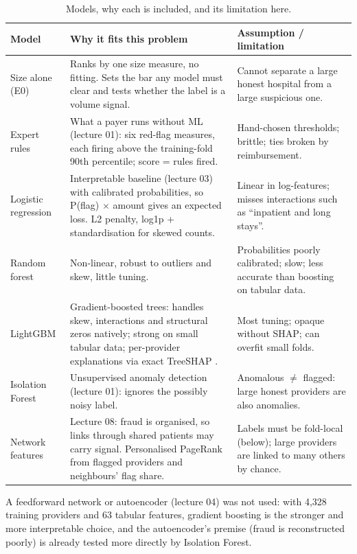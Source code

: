\documentclass[11pt,a4paper]{article}
\begin{document}
\begin{table}[H]\centering\small
\caption{Models, why each is included, and its limitation here.}\label{tab:models}
\begin{tabularx}{\linewidth}{p{2.5cm}XX}
\toprule
Model & Why it fits this problem & Assumption / limitation \\
\midrule
Size alone (E0) & Ranks by one size measure, no fitting. Sets the bar any model must clear and tests whether the label is a volume signal. & Cannot separate a large honest hospital from a large suspicious one. \\
Expert rules & What a payer runs without ML (lecture 01): six red-flag measures, each firing above the training-fold 90th percentile; score = rules fired. & Hand-chosen thresholds; brittle; ties broken by reimbursement. \\
Logistic regression & Interpretable baseline (lecture 03) with calibrated probabilities, so P(flag) $\times$ amount gives an expected loss. L2 penalty, log1p + standardisation for skewed counts. & Linear in log-features; misses interactions such as ``inpatient and long stays''. \\
Random forest & Non-linear, robust to outliers and skew, little tuning. & Probabilities poorly calibrated; slow; less accurate than boosting on tabular data. \\
LightGBM \cite{lightgbm} & Gradient-boosted trees: handles skew, interactions and structural zeros natively; strong on small tabular data; per-provider explanations via exact TreeSHAP \cite{treeshap}. & Most tuning; opaque without SHAP; can overfit small folds. \\
Isolation Forest & Unsupervised anomaly detection (lecture 01): ignores the possibly noisy label. & Anomalous $\neq$ flagged: large honest providers are also anomalies. \\
Network features & Lecture 08: fraud is organised, so links through shared patients may carry signal. Personalised PageRank from flagged providers and neighbours' flag share. & Labels must be fold-local (below); large providers are linked to many others by chance. \\
\bottomrule
\end{tabularx}
\end{table}

A feedforward network or autoencoder (lecture 04) was not used: with 4,328 training providers and 63 tabular features, gradient boosting is the stronger and more interpretable choice, and the autoencoder's premise (fraud is reconstructed poorly) is already tested more directly by Isolation Forest.
\end{document}
